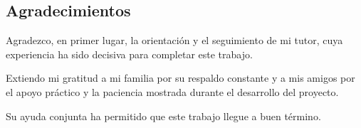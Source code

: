 \cleardoublepage            %
{}

\thispagestyle{empty}       %

\vspace*{\fill}             %
\begin{center}
\section*{Agradecimientos}

Agradezco, en primer lugar, la orientación y el seguimiento de mi tutor,  
cuya experiencia ha sido decisiva para completar este trabajo.

Extiendo mi gratitud a mi familia por su respaldo constante y a mis amigos  
por el apoyo práctico y la paciencia mostrada durante el desarrollo del proyecto.

Su ayuda conjunta ha permitido que este trabajo llegue a buen término.
\end{center}
\vspace*{\fill}             %
